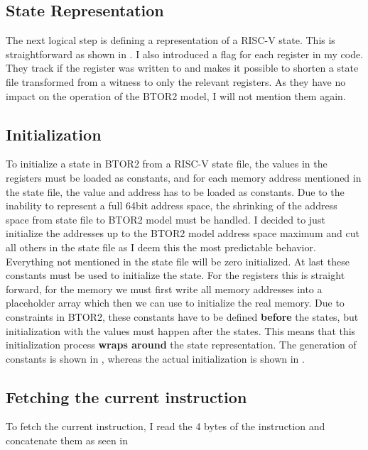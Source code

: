 


\subsection{State Representation}
The next logical step is defining a representation of a RISC-V state.
This is straightforward as shown in . I also
introduced a flag for each register in my code. They track if the
register was written to and makes it possible to shorten a state file
transformed from a witness to only the relevant registers. As they
have no impact on the operation of the BTOR2 model, I will not
mention them again. 

\subsection{Initialization}
To initialize a state in BTOR2 from a RISC-V state file, the values
in the registers must be loaded as constants, and for each memory
address mentioned in the state file, the value and address has to be
loaded as constants. Due to the inability to represent a full 64bit
address space, the shrinking of the address space from state file to
BTOR2 model must be handled. I decided to just initialize the
addresses up to the BTOR2 model address space maximum and cut all
others in the state file as I deem this the most predictable
behavior. Everything not mentioned in the state file will be zero
initialized. At last these constants must be used to initialize the
state. For the registers this is straight forward, for the memory we
must first write all memory addresses into a placeholder array which
then we can use to initialize the real memory. Due to constraints in
BTOR2, these constants have to be defined \textbf{before} the states,
but initialization with the values must happen after the states. This
means that this initialization process \textbf{wraps around} the
state representation. The generation of constants is shown in
, whereas the actual
initialization is shown in .



\subsection{Fetching the current instruction}
To fetch the current instruction, I read the 4 bytes of the
instruction and concatenate them as seen in 


